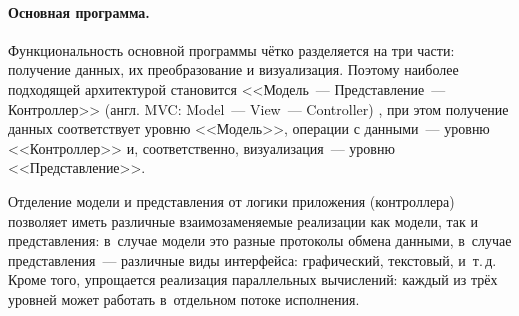 \documentclass[a4paper, 14pt]{extarticle}
\newcommand{\eng}[1]{{\English #1}}
\begin{document}
  \paragraph{Основная программа.}
  Функциональность основной программы чётко разделяется на три части: получение данных, их
  преобразование и визуализация. Поэтому наиболее подходящей архитектурой становится
  <<Модель~--- Представление~--- Контроллер>> (англ. \eng{MVC: Model~--- View~--- Controller})
  \cite{gamma-patterns}, при этом получение данных соответствует уровню <<Модель>>, операции с
  данными~--- уровню <<Контроллер>> и, соответственно, визуализация~--- уровню <<Представление>>.


  Отделение модели и представления от логики приложения (контроллера) позволяет иметь различные
  взаимозаменяемые реализации как модели, так и представления: в~случае модели это разные протоколы
  обмена данными, в~случае представления~--- различные виды интерфейса: графический, текстовый, и~т.\,д.
  Кроме того, упрощается реализация параллельных вычислений: каждый из трёх уровней может работать
  в~отдельном потоке исполнения.
\end{document}
